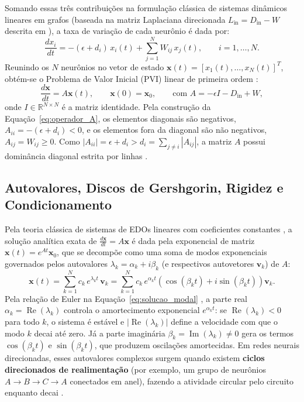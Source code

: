 \documentclass[12pt,a4paper]{article}
\begin{document}
Somando essas três contribuições na formulação clássica de sistemas dinâmicos lineares em grafos (baseada na matriz Laplaciana direcionada $L_{\text{in}} = D_{\text{in}} - W$ descrita em \cite{strang1997}), a taxa de variação de cada neurônio é dada por:
\begin{equation}
    \frac{dx_i}{dt} = -(\epsilon + d_i)\,x_i(t) + \sum_{j=1}^{N} W_{ij}\,x_j(t), \qquad i = 1, \dots, N.
    \label{eq:edo_componente}
\end{equation}
Reunindo os $N$ neurônios no vetor de estado $\mathbf{x}(t) = [x_1(t), \dots, x_N(t)]^T$, obtém-se o Problema de Valor Inicial (PVI) linear de primeira ordem \cite{burden2016,hairer1996}:
\begin{equation}
    \frac{d\mathbf{x}}{dt} = A\mathbf{x}(t), \qquad \mathbf{x}(0) = \mathbf{x}_0, \qquad \text{com } A = -\epsilon I - D_{\text{in}} + W,
    \label{eq:operador_A}
\end{equation}
onde $I \in \mathbb{R}^{N \times N}$ é a matriz identidade. Pela construção da Equação~\eqref{eq:operador_A}, os elementos diagonais são negativos, $A_{ii} = -(\epsilon + d_i) < 0$, e os elementos fora da diagonal são não negativos, $A_{ij} = W_{ij} \ge 0$. Como $|A_{ii}| = \epsilon + d_i > d_i = \sum_{j \neq i} |A_{ij}|$, a matriz $A$ possui dominância diagonal estrita por linhas \cite{burden2016}.

\subsection{Autovalores, Discos de Gershgorin, Rigidez e Condicionamento}

Pela teoria clássica de sistemas de EDOs lineares com coeficientes constantes \cite{strang1997,hairer1996}, a solução analítica exata de $\frac{d\mathbf{x}}{dt} = A\mathbf{x}$ é dada pela exponencial de matriz $\mathbf{x}(t) = e^{At}\mathbf{x}_0$, que se decompõe como uma soma de modos exponenciais governados pelos autovalores $\lambda_k = \alpha_k + i\beta_k$ (e respectivos autovetores $\mathbf{v}_k$) de $A$:
\begin{equation}
    \mathbf{x}(t) = \sum_{k=1}^{N} c_k\, e^{\lambda_k t}\, \mathbf{v}_k = \sum_{k=1}^{N} c_k\, e^{\alpha_k t}\left(\cos(\beta_k t) + i\sin(\beta_k t)\right)\mathbf{v}_k.
    \label{eq:solucao_modal}
\end{equation}
Pela relação de Euler na Equação~\eqref{eq:solucao_modal} \cite{burden2016}, a parte real $\alpha_k = \operatorname{Re}(\lambda_k)$ controla o amortecimento exponencial $e^{\alpha_k t}$: se $\operatorname{Re}(\lambda_k) < 0$ para todo $k$, o sistema é estável e $|\operatorname{Re}(\lambda_k)|$ define a velocidade com que o modo $k$ decai até zero. Já a parte imaginária $\beta_k = \operatorname{Im}(\lambda_k) \neq 0$ gera os termos $\cos(\beta_k t)$ e $\sin(\beta_k t)$, que produzem oscilações amortecidas. Em redes neurais direcionadas, esses autovalores complexos surgem quando existem \textbf{ciclos direcionados de realimentação} (por exemplo, um grupo de neurônios $A \to B \to C \to A$ conectados em anel), fazendo a atividade circular pelo circuito enquanto decai \cite{strang1997,scheffer2020}.
\end{document}
